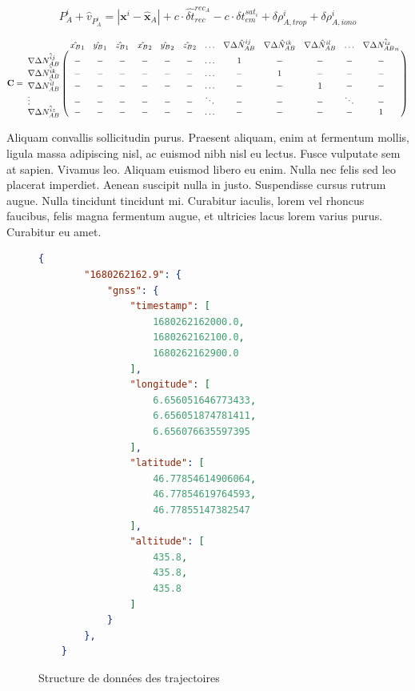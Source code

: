 \documentclass[twoside]{report}
\begin{document}
\begin{equation}
\boxed{
P^{i}_{A} + {\hat{v}}_{P^{i}_{A}} = |\textbf{x}^i - {\hat{\textbf{x}}}_A| + c \cdot \hat{\delta t}^{rec_A}_{rec} - c \cdot {\delta t}^{sat_i}_{em} + \delta \rho^{i}_{A,trop} + \delta \rho^{i}_{A,iono}
}
\label{eq_obs_pseudodistance}
\end{equation}

\begin{equation}
\mathbf{C} = 
\bordermatrix{
    & \hat{x_B}_1 & \hat{y_B}_1 & \hat{z_B}_1 & \hat{x_B}_2 & \hat{y_B}_2 & \hat{z_B}_2 & \ldots & \nabla \Delta \hat{N}^{ij}_{AB} & \nabla \Delta \hat{N}^{ik}_{AB} & \nabla \Delta \hat{N}^{il}_{AB} & \ldots & \nabla \Delta \hat{N^{iz}_{AB}}_n\cr
\nabla \Delta \hat{N^{ij}_{AB}} & - & - & - & - & - & - & \ldots & 1 & - & - & - & -\cr
\nabla \Delta \hat{N^{ik}_{AB}} & - & - & - & - & - & - & \ldots & - & 1 & - & - & -\cr
\nabla \Delta \hat{N^{il}_{AB}} & - & - & - & - & - & - & \ldots & - & - & 1 & - & -\cr
\vdots & - & - & - & - & - & - & \ddots & - & - & - & \ddots & - \cr
\nabla \Delta \hat{N^{iz}_{AB}} & - & - & - & - & - & - & \ldots & - & - & - & - & 1\cr
}
\end{equation}

Aliquam convallis sollicitudin purus. Praesent aliquam, enim at fermentum mollis, ligula massa adipiscing nisl, ac euismod nibh nisl eu lectus. Fusce vulputate sem at sapien. Vivamus leo. Aliquam euismod libero eu enim. Nulla nec felis sed leo placerat imperdiet. Aenean suscipit nulla in justo. Suspendisse cursus rutrum augue. Nulla tincidunt tincidunt mi. Curabitur iaculis, lorem vel rhoncus faucibus, felis magna fermentum augue, et ultricies lacus lorem varius purus. Curabitur eu amet.

\begin{figure}[ht]
    \begin{lstlisting}[language=Json]
    {
        "1680262162.9": {
            "gnss": {
                "timestamp": [
                    1680262162000.0,
                    1680262162100.0, 
                    1680262162900.0
                ],
                "longitude": [
                    6.656051646773433,
                    6.656051874781411,
                    6.656076635597395
                ],
                "latitude": [
                    46.77854614906064,
                    46.77854619764593,
                    46.77855147382547
                ],
                "altitude": [
                    435.8,
                    435.8,
                    435.8
                ]
            }
        },
    }
    \end{lstlisting}
    \caption{Structure de données des trajectoires}\label{fig:fichier_Json}
\end{figure}
\end{document}
